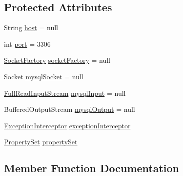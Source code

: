 \subsection*{Protected Attributes}
\begin{DoxyCompactItemize}
\item 
String \mbox{\hyperlink{classcom_1_1mysql_1_1cj_1_1protocol_1_1_abstract_socket_connection_ae1a4f81ab84d4b96039593235e0ac503}{host}} = null
\item 
int \mbox{\hyperlink{classcom_1_1mysql_1_1cj_1_1protocol_1_1_abstract_socket_connection_a86bceb260a09ea8f5900eaaec486bdd3}{port}} = 3306
\item 
\mbox{\hyperlink{interfacecom_1_1mysql_1_1cj_1_1protocol_1_1_socket_factory}{Socket\+Factory}} \mbox{\hyperlink{classcom_1_1mysql_1_1cj_1_1protocol_1_1_abstract_socket_connection_a8933d154a7c6d4c09ad58d50e757339c}{socket\+Factory}} = null
\item 
Socket \mbox{\hyperlink{classcom_1_1mysql_1_1cj_1_1protocol_1_1_abstract_socket_connection_a7d15313ca5c5dc5cc79990b012f27c5a}{mysql\+Socket}} = null
\item 
\mbox{\hyperlink{classcom_1_1mysql_1_1cj_1_1protocol_1_1_full_read_input_stream}{Full\+Read\+Input\+Stream}} \mbox{\hyperlink{classcom_1_1mysql_1_1cj_1_1protocol_1_1_abstract_socket_connection_a8e7f00881c12ca5a9424a24fa567cb85}{mysql\+Input}} = null
\item 
Buffered\+Output\+Stream \mbox{\hyperlink{classcom_1_1mysql_1_1cj_1_1protocol_1_1_abstract_socket_connection_aa8cb2f97ad87f0e55f08b29b6adff99a}{mysql\+Output}} = null
\item 
\mbox{\hyperlink{interfacecom_1_1mysql_1_1cj_1_1exceptions_1_1_exception_interceptor}{Exception\+Interceptor}} \mbox{\hyperlink{classcom_1_1mysql_1_1cj_1_1protocol_1_1_abstract_socket_connection_af14504cb2ea0f50ee8270b183390703d}{exception\+Interceptor}}
\item 
\mbox{\hyperlink{interfacecom_1_1mysql_1_1cj_1_1conf_1_1_property_set}{Property\+Set}} \mbox{\hyperlink{classcom_1_1mysql_1_1cj_1_1protocol_1_1_abstract_socket_connection_a7f85b3c010df78aee36e42bcf590381b}{property\+Set}}
\end{DoxyCompactItemize}


\subsection{Member Function Documentation}
\mbox{\label{classcom_1_1mysql_1_1cj_1_1protocol_1_1_abstract_socket_connection_adeac7abffbd9deac0a2ab724e803ed91}} 
